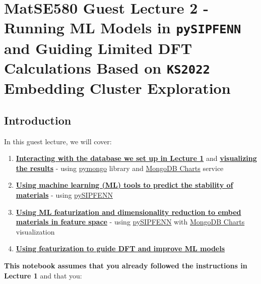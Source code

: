 \chapter{MatSE580 Guest Lecture 2 - Running ML Models in \texttt{pySIPFENN} and Guiding Limited DFT Calculations Based on \texttt{KS2022} Embedding Cluster Exploration} 
\label{chap:pysipfenntutorial2} 

\hypertarget{introduction}{%
\section{Introduction}\label{pysipfenntutorial2:introduction}}

In this guest lecture, we will cover:
\begin{enumerate}
    \item \protect\hyperlink{verify-the-connection-to-the-database}{\textbf{Interacting with the database we set up in Lecture 1}} and \protect\hyperlink{plotting-with-mongodb-charts}{\textbf{visualizing the results}} - using \href{https://github.com/mongodb/mongo-python-driver}{pymongo} library and \href{https://www.mongodb.com/docs/charts/}{MongoDB Charts} service
    
    \item \protect\hyperlink{pysipfenn}{\textbf{Using machine learning (ML) tools to predict the stability of materials}} - using \href{https://pysipfenn.readthedocs.io/en/stable/}{pySIPFENN} 
    
    \item \protect\hyperlink{featurization}{\textbf{Using ML featurization and dimensionality reduction to embed materials in feature space}} - using \href{https://pysipfenn.readthedocs.io/en/stable/}{pySIPFENN} with \href{https://www.mongodb.com/docs/charts/}{MongoDB Charts} visualization 
    
    \item \protect\hyperlink{transfer-learning-on-small-dft-dataset}{\textbf{Using featurization to guide DFT and improve ML models}}
\end{enumerate}

\textbf{This notebook assumes that you already followed the instructions
in Lecture 1} and that you:

